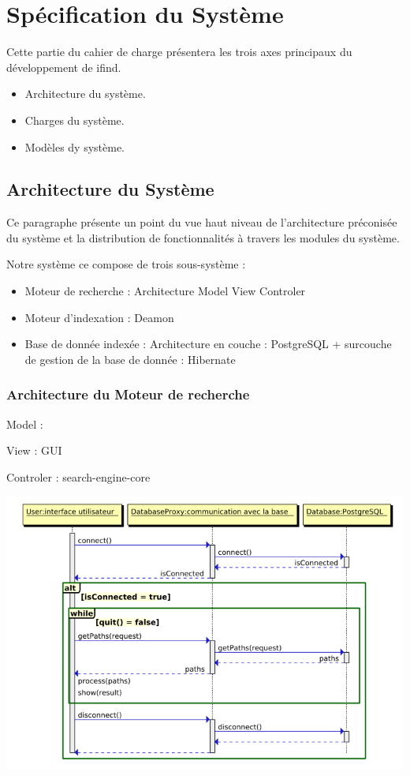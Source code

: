 \section{Spécification du Système}
Cette partie du cahier de charge présentera les trois axes principaux du développement de ifind.
\begin{itemize}
 \item Architecture du système.
 \item Charges du système.
 \item Modèles dy système.
\end{itemize}

\subsection{Architecture du Système}
Ce paragraphe présente un point du vue haut niveau de l'architecture préconisée du système et la distribution de fonctionnalités à travers 
les modules du système.

Notre système ce compose de trois sous-système :
\begin{itemize}
 \item Moteur de recherche : Architecture Model View Controler
 \item Moteur d'indexation : Deamon
 \item Base de donnée indexée : Architecture en couche : PostgreSQL + surcouche de gestion de la base de donnée : Hibernate
\end{itemize}

\subsubsection{Architecture du Moteur de recherche}


Model :

View : GUI

Controler : search-engine-core
\begin{center}
\includegraphics[scale=0.5]{seqmrbi.png}
\end{center}


